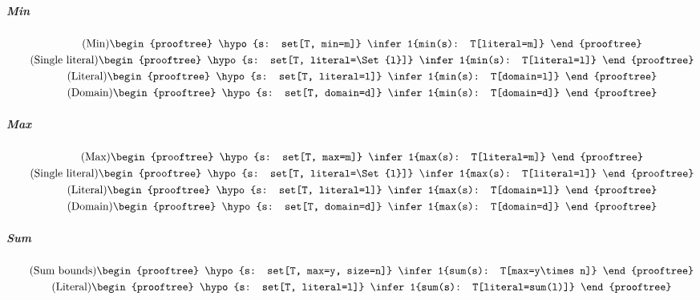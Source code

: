 \subparagraph{Min}
\begin{gather}
  \tag{Min}
  \begin{prooftree}
    \hypo{s: set[T, min=m]}
    \infer1{min(s): T[literal=m]}
  \end{prooftree}
  \\
  \tag{Single literal}
  \begin{prooftree}
    \hypo{s: set[T, literal=\Set{l}]}
    \infer1{min(s): T[literal=l]}
  \end{prooftree}
  \\
  \tag{Literal}
  \begin{prooftree}
    \hypo{s: set[T, literal=l]}
    \infer1{min(s): T[domain=l]}
  \end{prooftree}
  \\
  \tag{Domain}
  \begin{prooftree}
    \hypo{s: set[T, domain=d]}
    \infer1{min(s): T[domain=d]}
  \end{prooftree}
\end{gather}
\subparagraph{Max}
\begin{gather}
  \tag{Max}
  \begin{prooftree}
    \hypo{s: set[T, max=m]}
    \infer1{max(s): T[literal=m]}
  \end{prooftree}
  \\
  \tag{Single literal}
  \begin{prooftree}
    \hypo{s: set[T, literal=\Set{l}]}
    \infer1{max(s): T[literal=l]}
  \end{prooftree}
  \\
  \tag{Literal}
  \begin{prooftree}
    \hypo{s: set[T, literal=l]}
    \infer1{max(s): T[domain=l]}
  \end{prooftree}
  \\
  \tag{Domain}
  \begin{prooftree}
    \hypo{s: set[T, domain=d]}
    \infer1{max(s): T[domain=d]}
  \end{prooftree}
\end{gather}
\subparagraph{Sum}
\begin{gather}
  \tag{Sum bounds}
  \begin{prooftree}
    \hypo{s: set[T, max=y, size=n]}
    \infer1{sum(s): T[max=y\times n]}
  \end{prooftree}
  \\
  \tag{Literal}
  \begin{prooftree}
    \hypo{s: set[T, literal=l]}
    \infer1{sum(s): T[literal=sum(l)]}
  \end{prooftree}
\end{gather}
